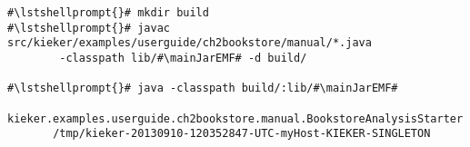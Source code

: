 \begin{lstlisting}[caption=Commands to compile and run the analysis under \UnixLikeSystems{},label=lst:bookstoreAnalysisStarterLinux] 			
#\lstshellprompt{}# mkdir build
#\lstshellprompt{}# javac src/kieker/examples/userguide/ch2bookstore/manual/*.java 
        -classpath lib/#\mainJarEMF# -d build/

#\lstshellprompt{}# java -classpath build/:lib/#\mainJarEMF#
       kieker.examples.userguide.ch2bookstore.manual.BookstoreAnalysisStarter 
       /tmp/kieker-20130910-120352847-UTC-myHost-KIEKER-SINGLETON
\end{lstlisting}	
